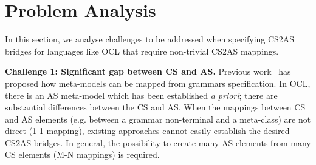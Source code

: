 \documentclass{llncs}
\begin{document}
 




\section{Problem Analysis}
\label{sec:problem}
In this section, we analyse challenges to be addressed when specifying CS2AS bridges for languages like OCL that require non-trivial CS2AS mappings.%

\textbf{Challenge 1: Significant gap between CS and AS.}
Previous work~\cite{wimmer2006bridgeGraMod,eysholdt2010Xtext} has proposed how meta-models can be mapped from grammars specification. In OCL, there is an AS meta-model which has been established \textit{a priori}; there are substantial differences between the CS and AS. When the mappings between CS and AS elements (e.g. between a grammar non-terminal and a meta-class) are not direct (1-1 mapping), existing approaches cannot easily establish the desired CS2AS bridges. In general, the possibility to create many AS elements from many CS elements (M-N mappings) is required.
\end{document}

